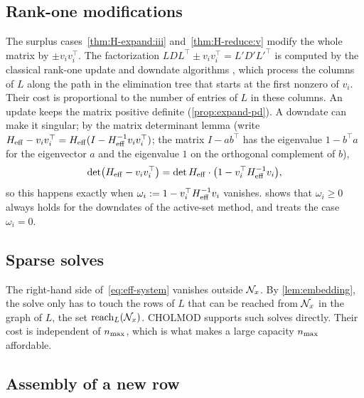 \subsection{Rank-one modifications}

The surplus cases~\ref{thm:H-expand:iii} and~\ref{thm:H-reduce:v} modify the whole matrix by $\pm v_iv_i^\top$. The factorization
$LDL^\top\pm v_iv_i^\top = L'D'L'^\top$ is computed by the classical rank-one update and downdate
algorithms \cite{gill1974methods, davis1999modifying}, which process the columns of $L$ along
the path in the elimination tree that starts at the first nonzero of $v_i$. Their cost is
proportional to the number of entries of $L$ in these columns. An update keeps the matrix
positive definite (\cref{prop:expand-pd}). A downdate can make it singular; by the matrix
determinant lemma (write $H_{\mathrm{eff}} - v_iv_i^\top = H_{\mathrm{eff}}(I - H_{\mathrm{eff}}^{-1}v_iv_i^\top)$; the matrix
$I - ab^\top$ has the eigenvalue $1 - b^\top a$ for the eigenvector $a$ and the eigenvalue $1$ on
the orthogonal complement of $b$),
\[
\det\bigl(H_{\mathrm{eff}} - v_iv_i^\top\bigr) = \det H_{\mathrm{eff}}\cdot\bigl(1 - v_i^\top H_{\mathrm{eff}}^{-1}v_i\bigr),
\]
so this happens exactly when $\omega_i := 1 - v_i^\top H_{\mathrm{eff}}^{-1}v_i$ vanishes.
 shows that $\omega_i\ge0$ always holds for the downdates of the
active-set method, and treats the case $\omega_i = 0$.

\subsection{Sparse solves}

The right-hand side of~\eqref{eq:eff-system} vanishes outside $\mathcal{N}_x$. By \cref{lem:embedding},
the solve only has to touch the rows of $L$ that can be reached from $\mathcal{N}_x$ in the graph of
$L$, the set $\operatorname{reach}_L(\mathcal{N}_x)$. CHOLMOD supports such solves directly. Their cost is independent
of $n_{\max}$, which is what makes a large capacity $n_{\max}$ affordable.

\subsection{Assembly of a new row}

